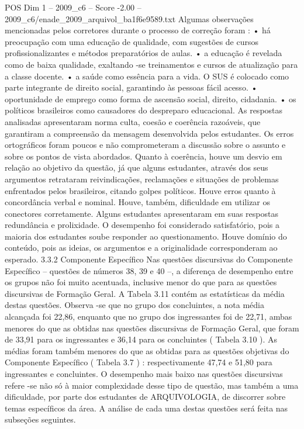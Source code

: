 \begin{textsample}{POS Dim 1 – 2009\_c6 – Score -2.00 – 2009\_c6/enade\_2009\_arquivol\_ba1f6e9589.txt}
Algumas observações mencionadas pelos corretores durante o processo de correção foram : • há preocupação com uma educação de qualidade, com sugestões de cursos profissionalizantes e métodos preparatórios de aulas. • a educação é revelada como de baixa qualidade, exaltando -se treinamentos e cursos de atualização para a classe docente. • a saúde como essência para a vida.
O SUS é colocado como parte integrante de direito social, garantindo às pessoas fácil acesso. • oportunidade de emprego como forma de ascensão social, direito, cidadania. • os políticos brasileiros como causadores do despreparo educacional.
As respostas analisadas apresentaram norma culta, coesão e coerência razoáveis, que garantiram a compreensão da mensagem desenvolvida pelos estudantes.
Os erros ortográficos foram poucos e não comprometeram a discussão sobre o assunto e sobre os pontos de vista abordados.
Quanto à coerência, houve um desvio em relação ao objetivo da questão, já que alguns estudantes, através dos seus argumentos retrataram reivindicações, reclamações e situações de problemas enfrentados pelos brasileiros, citando golpes políticos.
Houve erros quanto à concordância verbal e nominal.
Houve, também, dificuldade em utilizar os conectores corretamente.
Alguns estudantes apresentaram em suas respostas redundância e prolixidade.
O desempenho foi considerado satisfatório, pois a maioria dos estudantes soube responder ao questionamento.
Houve domínio do conteúdo, pois as ideias, os argumentos e a originalidade corresponderam ao esperado. 3.3.2 Componente Específico Nas questões discursivas do Componente Específico – questões de números 38, 39 e 40 –, a diferença de desempenho entre os grupos não foi muito acentuada, inclusive menor do que para as questões discursivas de Formação Geral.
A Tabela 3.11 contém as estatísticas da média destas questões.
Observa -se que no grupo dos concluintes, a nota média alcançada foi 22,86, enquanto que no grupo dos ingressantes foi de 22,71, ambas menores do que as obtidas nas questões discursivas de Formação Geral, que foram de 33,91 para os ingressantes e 36,14 para os concluintes ( Tabela 3.10 ).
As médias foram também menores do que as obtidas para as questões objetivas do Componente Específico ( Tabela 3.7 ) : respectivamente 47,74 e 51,80 para ingressantes e concluintes.
O desempenho mais baixo nas questões discursivas refere -se não só à maior complexidade desse tipo de questão, mas também a uma dificuldade, por parte dos estudantes de ARQUIVOLOGIA, de discorrer sobre temas específicos da área.
A análise de cada uma destas questões será feita nas subseções seguintes.

\end{textsample}
